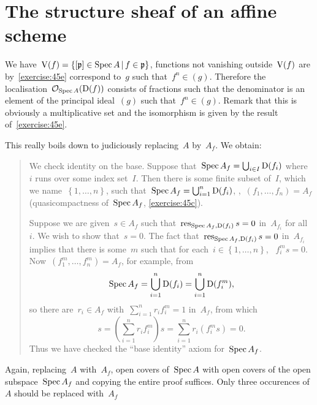 \section{The structure sheaf of an affine scheme}

\begin{exercise}
  We have~$\operatorname{V}(f)=\left\{ [\mathfrak{p}]\in\operatorname{Spec} A\,|\,f\in\mathfrak{p} \right\}$, functions not vanishing outside~$\operatorname{V}(f)$ are by~\autoref{exercise:45e} correspond to~$g$ such that~$f^n\in(g)$. Therefore the localisation~$\mathcal{O}_{\operatorname{Spec} A}(\operatorname{D}(f))$ consists of fractions such that the denominator is an element of the principal ideal~$(g)$ such that~$f^n\in(g)$. Remark that this is obviously a multiplicative set and the isomorphism is given by the result of~\autoref{exercise:45e}.
\end{exercise}

\begin{exercise}
  This really boils down to judiciously replacing~$A$ by~$A_f$. We obtain:
  \begin{quote}
    We check identity on the base. Suppose that~$\operatorname{Spec} A_f=\bigcup_{i\in I}\operatorname{D}(f_i)$ where~$i$ runs over some index set~$I$. Then there is some finite subset of~$I$, which we name~$\left\{ 1,\ldots,n \right\}$, such that~$\operatorname{Spec} A_f=\bigcup_{i=1}^n\operatorname{D}(f_i)$, \ie,~$(f_1,\ldots,f_n)=A_f$ (quasicompactness of~$\operatorname{Spec} A_f$, \autoref{exercise:45c}).

    Suppose we are given~$s\in A_f$ such that~$\operatorname{res}_{\operatorname{Spec} A_f,\operatorname{D}(f_i)}s=0$ in~$A_{f_i}$ for all~$i$. We wish to show that~$s=0$. The fact that~$\operatorname{res}_{\operatorname{Spec} A_f,\operatorname{D}(f_i)}s=0$ in~$A_{f_i}$ implies that there is some~$m$ such that for each~$i\in\left\{ 1,\ldots,n \right\}$, ~$f_i^ms=0$. Now~$(f_1^m,\ldots,f_n^m)=A_f$, for example, from
    \begin{equation}
      \operatorname{Spec} A_f=\bigcup_{i=1}^n\operatorname{D}(f_i)=\bigcup_{i=1}^n\operatorname{D}(f_i^m),
    \end{equation}
    so there are~$r_i\in A_f$ with~$\sum_{i=1}^nr_if_i^m=1$ in~$A_f$, from which
    \begin{equation}
      s=\left( \sum_{i=1}^nr_if_i^m \right)s=\sum_{i=1}^nr_i(f_i^ms)=0.
    \end{equation}
    Thus we have checked the ``base identity'' axiom for~$\operatorname{Spec} A_f$.
  \end{quote}
\end{exercise}

\begin{exercise}
  \label{exercise:51c}
  Again, replacing~$A$ with~$A_f$, open covers of~$\operatorname{Spec} A$ with open covers of the open subspace~$\operatorname{Spec} A_f$ and copying the entire proof suffices. Only three occurences of~$A$ should be replaced with~$A_f$
\end{exercise}

